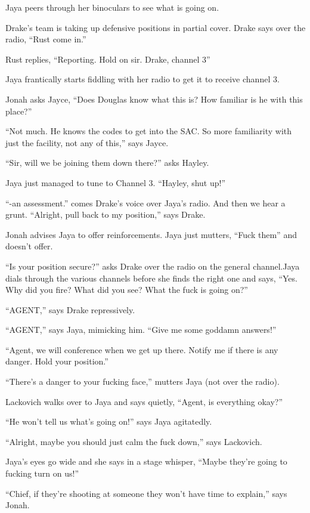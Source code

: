 Jaya peers through her binoculars to see what is going on.

Drake's team is taking up defensive positions in partial cover.  Drake says over the radio, ``Rust come in.''  

Rust replies, ``Reporting.  Hold on sir.  Drake, channel 3''  

Jaya frantically starts fiddling with her radio to get it to receive channel 3.

Jonah asks Jayce, ``Does Douglas know what this is?  How familiar is he with this place?''

``Not much.  He knows the codes to get into the SAC.  So more familiarity with just the facility, not any of this,'' says Jayce.

``Sir, will we be joining them down there?'' asks Hayley.

Jaya just managed to tune to Channel 3.  ``Hayley, shut up!''

``-an assessment.'' comes Drake's voice over Jaya's radio.  And then we hear a grunt.  ``Alright, pull back to my position,'' says Drake.

Jonah advises Jaya to offer reinforcements.  Jaya just mutters, ``Fuck them'' and doesn't offer.

``Is your position secure?'' asks Drake over the radio on the general channel.Jaya dials through the various channels before she finds the right one and says, ``Yes.  Why did you fire?  What did you see?  What the fuck is going on?''

``AGENT,'' says Drake repressively.

``AGENT,'' says Jaya, mimicking him.  ``Give me some goddamn answers!''

``Agent, we will conference when we get up there. Notify me if there is any danger.  Hold your position.''

``There's a danger to your fucking face,'' mutters Jaya (not over the radio).

Lackovich walks over to Jaya and says quietly, ``Agent, is everything okay?''

``He won't tell us what's going on!'' says Jaya agitatedly.

``Alright, maybe you should just calm the fuck down,'' says Lackovich.

Jaya's eyes go wide and she says in a stage whisper, ``Maybe they're going to fucking turn on us!''

``Chief, if they're shooting at someone they won't have time to explain,'' says Jonah.

